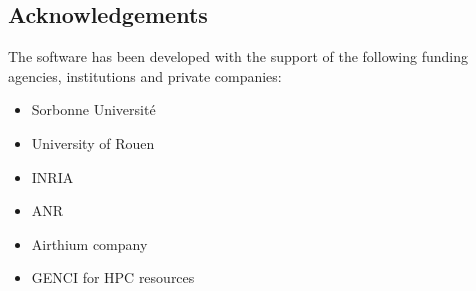 \subsection{Acknowledgements}
\label{sec::Freefem++:acknowledgements}

The software has been developed with the support of the following funding agencies, institutions and private companies:

\begin{itemize}
\item Sorbonne Université
\item University of Rouen
\item INRIA
\item ANR
\item Airthium company
\item GENCI for HPC resources
\end{itemize}